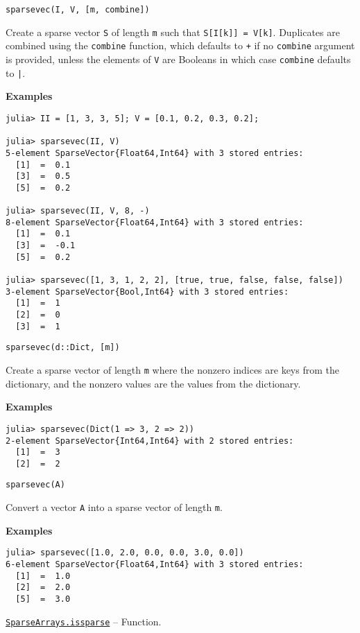 \begin{adjustwidth}{2em}{0pt}


\begin{verbatim}
sparsevec(I, V, [m, combine])
\end{verbatim}

Create a sparse vector \texttt{S} of length \texttt{m} such that \texttt{S[I[k]] = V[k]}. Duplicates are combined using the \texttt{combine} function, which defaults to \texttt{+} if no \texttt{combine} argument is provided, unless the elements of \texttt{V} are Booleans in which case \texttt{combine} defaults to \texttt{|}.

\textbf{Examples}


\begin{verbatim}
julia> II = [1, 3, 3, 5]; V = [0.1, 0.2, 0.3, 0.2];

julia> sparsevec(II, V)
5-element SparseVector{Float64,Int64} with 3 stored entries:
  [1]  =  0.1
  [3]  =  0.5
  [5]  =  0.2

julia> sparsevec(II, V, 8, -)
8-element SparseVector{Float64,Int64} with 3 stored entries:
  [1]  =  0.1
  [3]  =  -0.1
  [5]  =  0.2

julia> sparsevec([1, 3, 1, 2, 2], [true, true, false, false, false])
3-element SparseVector{Bool,Int64} with 3 stored entries:
  [1]  =  1
  [2]  =  0
  [3]  =  1
\end{verbatim}




\begin{lstlisting}
sparsevec(d::Dict, [m])
\end{lstlisting}

Create a sparse vector of length \texttt{m} where the nonzero indices are keys from the dictionary, and the nonzero values are the values from the dictionary.

\textbf{Examples}


\begin{verbatim}
julia> sparsevec(Dict(1 => 3, 2 => 2))
2-element SparseVector{Int64,Int64} with 2 stored entries:
  [1]  =  3
  [2]  =  2
\end{verbatim}




\begin{lstlisting}
sparsevec(A)
\end{lstlisting}

Convert a vector \texttt{A} into a sparse vector of length \texttt{m}.

\textbf{Examples}


\begin{verbatim}
julia> sparsevec([1.0, 2.0, 0.0, 0.0, 3.0, 0.0])
6-element SparseVector{Float64,Int64} with 3 stored entries:
  [1]  =  1.0
  [2]  =  2.0
  [5]  =  3.0
\end{verbatim}



\end{adjustwidth}
\hypertarget{14062776301471954766}{} 
\hyperlink{14062776301471954766}{\texttt{SparseArrays.issparse}}  -- {Function.}

